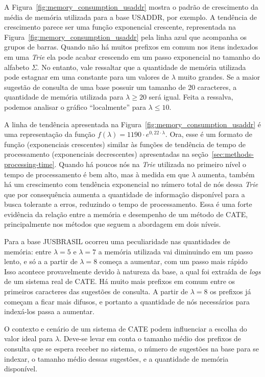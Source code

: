 A Figura~\ref{fig:memory_consumption_usaddr} mostra o padrão de crescimento da média de memória utilizada para a base USADDR, por exemplo. A tendência de crescimento parece ser uma função exponencial crescente, representada na Figura~\ref{fig:memory_consumption_usaddr} pela linha azul que acompanha os grupos de barras. Quando não há muitos prefixos em comum nos itens indexados em uma \textit{Trie} ela pode acabar crescendo em um passo exponencial no tamanho do alfabeto $\Sigma$.  No entanto, vale ressaltar que a quantidade de memória utilizada pode estagnar em uma constante para um valores de $\lambda$ muito grandes. Se a maior sugestão de consulta de uma base possuir um tamanho de 20 caracteres, a quantidade de memória utilizada para $\lambda \geq 20$ será igual. Feita a ressalva, podemos analisar o gráfico ``localmente'' para $\lambda \leq 10$.

A linha de tendência apresentada na Figura~\ref{fig:memory_consumption_usaddr} é uma representação da função $f(\lambda)=1190\cdot e^{0,22\cdot\lambda}$. Ora, esse é um formato de função (exponenciais crescentes) similar às funções de tendência de tempo de processamento (exponenciais decrescentes) apresentadas na seção~\ref{sec:methods-processing-time}. Quando há poucos nós na \textit{Trie} utilizada no primeiro nível o tempo de processamento é bem alto, mas à medida em que $\lambda$ aumenta, também há um crescimento com tendência exponencial no número total de nós dessa \textit{Trie} que por consequência aumenta a quantidade de informação disponível para a busca tolerante a erros, reduzindo o tempo de processamento. Essa é uma forte evidência da relação entre a memória e desempenho de um método de CATE, principalmente nos métodos que seguem a abordagem em dois níveis.

Para a base JUSBRASIL ocorreu uma peculiaridade nas quantidades de memória: entre $\lambda=5$ e $\lambda=7$ a memória utilizada vai diminuindo em um passo lento, e só a a partir de $\lambda=8$ começa a aumentar, com um passo mais rápido Isso acontece provavelmente devido à natureza da base, a qual foi extraída de \textit{logs} de um sistema real de CATE. Há muito mais prefixos em comum entre os primeiros caracteres das sugestões de consulta. A partir de $\lambda=8$ os prefixos já começam a ficar mais difusos, e portanto a quantidade de nós necessários para indexá-los passa a aumentar.

O contexto e cenário de um sistema de CATE podem influenciar a escolha do valor ideal para $\lambda$. Deve-se levar em conta o tamanho médio dos prefixos de consulta que se espera receber no sistema, o número de sugestões na base para se indexar, o tamanho médio dessas sugestões, e a quantidade de memória disponível. 

